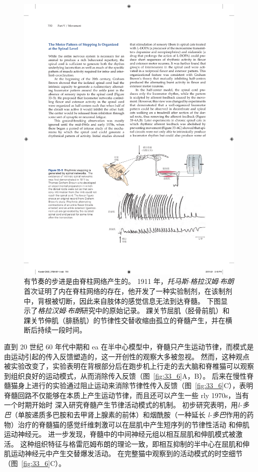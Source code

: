 \begin{figure}[htbp]
	\centering
	\includegraphics[width=0.85\linewidth]{chap33/fig_33_5}
	\caption{有节奏的步进是由脊柱网络产生的。
	1911 年，\textit{托马斯$\cdot$格拉汉姆$\cdot$布朗}首次证明了内在脊柱网络的存在，他开发了一种实验制剂，在该制剂中，背根被切断，因此来自肢体的感觉信息无法到达脊髓。
	下图显示了\textit{格拉汉姆$\cdot$布朗}研究中的原始记录。
	踝关节屈肌（胫骨前肌）和踝关节伸肌（腓肠肌）的节律性交替收缩由孤立的脊髓产生，并在横断后持续一段时间。}
	\label{fig:33_5}
\end{figure}


直到 20 世纪 60 年代中期和 ea 在半中心模型中，脊髓只产生运动节律，而模式是由运动引起的传入反馈塑造的，这一开创性的观察大多被忽视。 
然而，这种观点被实验改变了，实验表明在背根部分后在跑步机上行走的去大脑和脊椎猫可以观察到组织良好的运动模式，从而消除传入反馈（图~\ref{fig:33_6}A，B）。 
后来在慢性脊髓猫身上进行的实验通过阻止运动来消除节律性传入反馈（图~\ref{fig:33_6}C），表明脊髓回路不仅能够在本质上产生运动节律，而且还可以产生一些 rly 1970s，当有一个时期开始时 深入研究脊髓产生节律活动模式的机制。
初步研究表明，用\textit{l-多巴}（单胺递质多巴胺和去甲肾上腺素的前体）和烟酰胺（一种延长 \textit{l-多巴}作用的药物）治疗的脊髓猫的感觉纤维刺激可以在屈肌中产生短序列的节律性活动 和伸肌运动神经元。
进一步发现，脊髓中的中间神经元组以相互屈肌和伸肌模式被激活。
这种组织特征与格雷厄姆布朗的理论一致，即相互抑制的半中心在屈肌和伸肌运动神经元中产生交替爆发活动。
在完整猫中观察到的活动模式的时空细节（图~\ref{fig:33_6}C）。


